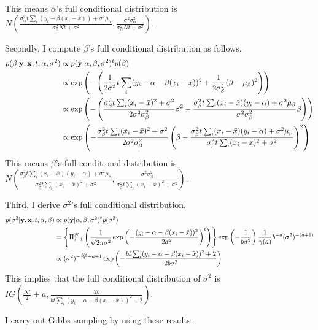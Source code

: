 \documentclass{article}
\begin{document}
	This means $\alpha$'s full conditional distribution is $N \left(\frac{\sigma_{\alpha}^2 t \sum_i (y_i - \beta(x_i -\bar{x})) + \sigma^2 \mu_{\alpha}}{\sigma_{\alpha}^2 Nt + \sigma^2}, \frac{\sigma^2 \sigma_{\alpha}^2}{\sigma_{\alpha}^2 Nt + \sigma^2} \right)$.
	\par
	Secondly, I compute $\beta$'s full conditional distribution as follows.
	\begin{align*}
		p(\beta | {\bf y}, {\bf x}, t, \alpha, \sigma^2) &\propto p({\bf y} | \alpha, \beta, \sigma^2)^t p(\beta)\\
		&\propto \exp \left( - \left( \frac{1}{2\sigma^2} t\sum_i (y_i - \alpha - \beta(x_i -\bar{x}))^2 + \frac{1}{2\sigma_{\beta}^2} (\beta - \mu_{\beta})^2 \right)\right)\\
		&\propto \exp \left( - \left( \frac{\sigma_{\beta}^2 t \sum_i (x_i - \bar{x})^2 + \sigma^2}{2\sigma^2 \sigma_{\beta}^2} \beta^2 - \frac{\sigma_{\beta}^2 t \sum_i (x_i- \bar{x})(y_i - \alpha) + \sigma^2 \mu_{\beta}}{\sigma^2 \sigma_{\beta}^2} \beta \right) \right)\\
		&\propto \exp \left( - \frac{\sigma_{\beta}^2 t \sum_i (x_i - \bar{x})^2 + \sigma^2}{2\sigma^2 \sigma_{\beta}^2} \left( \beta - \frac{\sigma_{\beta}^2 t \sum_i (x_i- \bar{x})(y_i - \alpha) + \sigma^2 \mu_{\beta}}{\sigma_{\beta}^2 t \sum_i (x_i - \bar{x})^2 + \sigma^2}\right)^2 \right)\\
	\end{align*}
	This means $\beta$'s full conditional distribution is $N\left( \frac{\sigma_{\beta}^2 t \sum_i (x_i- \bar{x})(y_i - \alpha) + \sigma^2 \mu_{\beta}}{\sigma_{\beta}^2 t \sum_i (x_i - \bar{x})^2 + \sigma^2}, \frac{\sigma^2 \sigma_{\beta}^2}{\sigma_{\beta}^2 t \sum_i (x_i - \bar{x})^2 + \sigma^2} \right)$.
	\par
	Third, I derive $\sigma^2$'s full conditional distribution.
	\begin{align*}
		p(\sigma^2 | {\bf y}, {\bf x}, t, \alpha, \beta) &\propto p({\bf y} | \alpha, \beta, \sigma^2)^t p(\sigma^2) \\
		&= \left\{ \Pi_{i=1}^{N} \left( \frac{1}{\sqrt{2\pi \sigma^2}} \exp \left( - \frac{(y_i - \alpha - \beta(x_i - \bar{x}))^2}{2\sigma^2}\right)^t \right) \right\} \exp \left( -\frac{1}{b \sigma^2} \right) \frac{1}{\gamma(a)} b^{-a} (\sigma^2)^{-(a + 1)}\\
		&\propto (\sigma^2)^{-\frac{Nt}{2} + a + 1} \exp \left( - \frac{bt \sum_i (y_i - \alpha - \beta(x_i -\bar{x}))^2 + 2}{2b\sigma^2} \right)\\
	\end{align*} 
	This implies that the full conditional distribution of $\sigma^2$ is $IG\left( \frac{Nt}{2} + a, \frac{2b}{bt \sum_i (y_i - \alpha - \beta(x_i -\bar{x}))^2 + 2} \right)$.
	\par
	I carry out Gibbs sampling by using these results.
\end{document}
